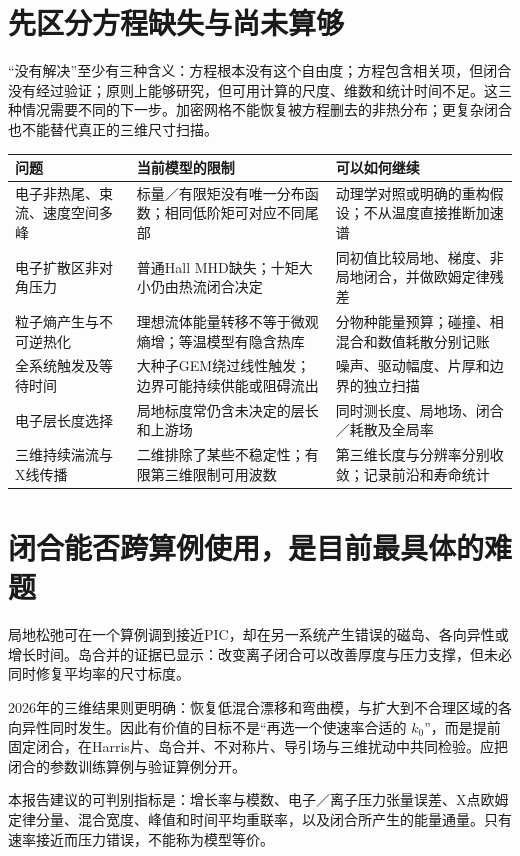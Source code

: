 \documentclass[UTF8,a4paper,11pt,openany,fontset=fandol]{ctexbook}
\begin{document}
\section{先区分方程缺失与尚未算够}
“没有解决”至少有三种含义：方程根本没有这个自由度；方程包含相关项，但闭合没有经过验证；原则上能够研究，但可用计算的尺度、维数和统计时间不足。这三种情况需要不同的下一步。加密网格不能恢复被方程删去的非热分布；更复杂闭合也不能替代真正的三维尺寸扫描。

\begin{longtable}{P{35mm}P{57mm}P{56mm}}
\toprule 问题 & 当前模型的限制 & 可以如何继续\\\midrule
电子非热尾、束流、速度空间多峰 & 标量／有限矩没有唯一分布函数；相同低阶矩可对应不同尾部 & 动理学对照或明确的重构假设；不从温度直接推断加速谱\\
电子扩散区非对角压力 & 普通Hall MHD缺失；十矩大小仍由热流闭合决定 & 同初值比较局地、梯度、非局地闭合，并做欧姆定律残差\\
粒子熵产生与不可逆热化 & 理想流体能量转移不等于微观熵增；等温模型有隐含热库 & 分物种能量预算；碰撞、相混合和数值耗散分别记账\\
全系统触发及等待时间 & 大种子GEM绕过线性触发；边界可能持续供能或阻碍流出 & 噪声、驱动幅度、片厚和边界的独立扫描\\
电子层长度选择 & 局地标度常仍含未决定的层长和上游场 & 同时测长度、局地场、闭合／耗散及全局率\\
三维持续湍流与X线传播 & 二维排除了某些不稳定性；有限第三维限制可用波数 & 第三维长度与分辨率分别收敛；记录前沿和寿命统计\\\bottomrule
\end{longtable}

\section{闭合能否跨算例使用，是目前最具体的难题}
局地松弛可在一个算例调到接近PIC，却在另一系统产生错误的磁岛、各向异性或增长时间。岛合并的证据已显示：改变离子闭合可以改善厚度与压力支撑，但未必同时修复平均率的尺寸标度。\citep{Ng2015,Ng2017,Ng2020}

2026年的三维结果则更明确：恢复低混合漂移和弯曲模，与扩大到不合理区域的各向异性同时发生。\citep{Closure2026}因此有价值的目标不是“再选一个使速率合适的 $k_0$”，而是提前固定闭合，在Harris片、岛合并、不对称片、导引场与三维扰动中共同检验。应把闭合的参数训练算例与验证算例分开。

本报告建议的可判别指标是：增长率与模数、电子／离子压力张量误差、X点欧姆定律分量、混合宽度、峰值和时间平均重联率，以及闭合所产生的能量通量。只有速率接近而压力错误，不能称为模型等价。
\end{document}

